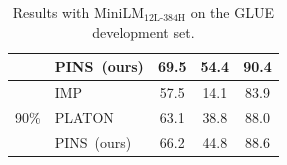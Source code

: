 \begin{table}[h]
\begin{tabular}{c|l|ccc}
		&PINS~(ours)                                             &   69.5                                                                                   &      54.4                                                                                 &  90.4                                                                                          \\
		\midrule
		\multirow{3}{*}{90\%}     &IMP                                              &   57.5                                                                                    &   14.1                                                                                     &   83.9                                                                                     \\
		& PLATON                                               &   63.1                                                                                   &  38.8                                                                                      &  88.0                                                                                        \\
		&PINS~(ours)                                             &   66.2                                                                                    &     44.8                                                                                  &   88.6                                                                                  \\
		\bottomrule                                     
	\end{tabular}
	\caption{Results with MiniLM$_{\text{12L-384H}}$ on the GLUE development set.}
	\label{table:electra}
\end{table}
